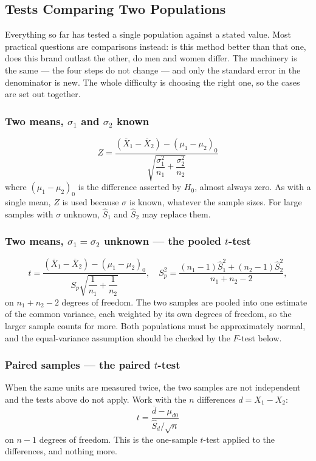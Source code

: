 \documentclass[11pt,a4paper]{article}
\theoremstyle{definition}
\begin{document}

\pagebreak
\subsection{Tests Comparing Two Populations}

Everything so far has tested a single population against a stated value. Most practical
questions are comparisons instead: is this method better than that one, does this brand
outlast the other, do men and women differ. The machinery is the same --- the four steps do
not change --- and only the standard error in the denominator is new. The whole difficulty
is choosing the right one, so the cases are set out together.

\subsubsection{Two means, $\sigma_1$ and $\sigma_2$ known}
\[Z=\frac{(\overline{X}_1-\overline{X}_2)-(\mu_1-\mu_2)_0}
{\sqrt{\dfrac{\sigma_1^2}{n_1}+\dfrac{\sigma_2^2}{n_2}}}\]
where $(\mu_1-\mu_2)_0$ is the difference asserted by $H_0$, almost always zero. As with a
single mean, $Z$ is used because $\sigma$ is known, whatever the sample sizes. For large
samples with $\sigma$ unknown, $\hat{S}_1$ and $\hat{S}_2$ may replace them.

\subsubsection{Two means, $\sigma_1=\sigma_2$ unknown --- the pooled $t$-test}
\[t=\frac{(\overline{X}_1-\overline{X}_2)-(\mu_1-\mu_2)_0}
{S_p\sqrt{\dfrac{1}{n_1}+\dfrac{1}{n_2}}},
\quad 
S_p^2=\frac{(n_1-1)\hat{S}_1^2+(n_2-1)\hat{S}_2^2}{n_1+n_2-2},\]
on $n_1+n_2-2$ degrees of freedom. The two samples are pooled into one estimate of the
common variance, each weighted by its own degrees of freedom, so the larger sample counts
for more. Both populations must be approximately normal, and the equal-variance assumption
should be checked by the $F$-test below.

\subsubsection{Paired samples --- the paired $t$-test}
When the same units are measured twice, the two samples are not independent and the tests
above do not apply. Work with the $n$ differences $d=X_1-X_2$:
\[t=\frac{\overline{d}-\mu_{d0}}{\hat{S}_d/\sqrt{n}}\]
on $n-1$ degrees of freedom. This is the one-sample $t$-test applied to the differences, and
nothing more.
\end{document}
